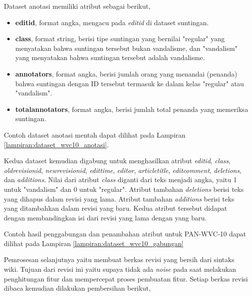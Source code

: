 Dataset anotasi memiliki atribut sebagai berikut,

\begin{itemize}
	\item \textbf{editid}, format angka, mengacu pada \textit{editid} di
	dataset suntingan.
	\item \textbf{class}, format string, berisi tipe suntingan yang
	bernilai "regular" yang menyatakan bahwa suntingan tersebut bukan
	vandalisme, dan "vandalism" yang menyatakan bahwa suntingan tersebut
	adalah vandalisme.
	\item \textbf{annotators}, format angka, berisi jumlah orang yang
	menandai (penanda) bahwa suntingan dengan ID tersebut termasuk ke dalam
	kelas "regular" atau "vandalism".
	\item \textbf{totalannotators}, format angka, berisi jumlah total penanda yang memeriksa suntingan.
\end{itemize}

Contoh dataset anotasi mentah dapat dilihat pada Lampiran
\ref{lampiran:dataset_wvc10_anotasi}.

Kedua dataset kemudian digabung untuk menghasilkan atribut \textit{editid},
\textit{class}, \textit{oldrevisionid}, \textit{newrevisionid},
\textit{edittime}, \textit{editor}, \textit{articletitle},
\textit{editcomment}, \textit{deletions}, dan \textit{additions}.
Nilai dari atribut \textit{class} diganti dari teks menjadi angka, yaitu 1
untuk "vandalism" dan 0 untuk "regular".
Atribut tambahan \textit{deletions} berisi teks yang dihapus dalam revisi yang
lama.
Atribut tambahan \textit{additions} berisi teks yang ditambahkan dalam revisi
yang baru.
Kedua atribut tersebut didapat dengan membandingkan isi dari revisi yang lama
dengan yang baru.

Contoh hasil penggabungan dan penambahan atribut untuk PAN-WVC-10 dapat dilihat
pada Lampiran \ref{lampiran:dataset_wvc10_gabungan}

Pemrosesan selanjutnya yaitu membuat berkas revisi yang bersih dari sintaks
wiki.
Tujuan dari revisi ini yaitu supaya tidak ada \textit{noise} pada saat
melakukan penghitungan fitur dan mempercepat proses pembuatan fitur.
Setiap berkas revisi dibaca kemudian dilakukan pembersihan berikut,

